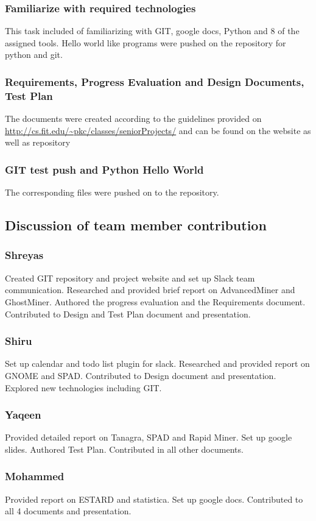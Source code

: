 \documentclass[12pt]{article}
\begin{document}
	\subsubsection{Familiarize with required technologies}
	This task included of familiarizing with GIT, google docs, Python and 8 of the assigned tools. Hello world like programs were pushed on the repository for python and git.
	\subsubsection{Requirements, Progress Evaluation and Design Documents, Test Plan}
	The documents were created according to the guidelines provided on \url{http://cs.fit.edu/~pkc/classes/seniorProjects/} and can be found on the website as well as repository
	\subsubsection{GIT test push and Python Hello World}
	The corresponding files were pushed on to the repository.
	\subsection{Discussion of team member contribution}
	\subsubsection{Shreyas}
	Created GIT repository and project website and set up Slack team communication. Researched and provided brief report on AdvancedMiner and GhostMiner. Authored the progress evaluation and the Requirements document. Contributed to Design and Test Plan document and presentation.
	\subsubsection{Shiru}
	Set up calendar and todo list plugin for slack. Researched and provided report on GNOME and SPAD. Contributed to Design document and presentation. Explored new technologies including GIT. 
	\subsubsection{Yaqeen}
	Provided detailed report on Tanagra, SPAD and Rapid Miner. Set up google slides. Authored Test Plan. Contributed in all other documents. 
	\subsubsection{Mohammed}
	Provided report on ESTARD and statistica. Set up google docs. Contributed to all 4 documents and presentation.
	
\end{document}
